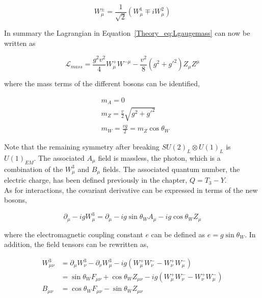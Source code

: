 \begin{equation}
    W_\mu^\pm = \frac{1}{\sqrt{2}}(W_\mu^1\mp i W_\mu^2)
\end{equation}

In summary the Lagrangian in Equation~\ref{Theory_eq:Lgaugemass} can now be written as

\begin{equation}
    \mathcal{L}_{mass} = \frac{g^2v^2}{4}W_\mu^+W^{- \mu} - \frac{v^2}{8}(g^2+g'^2)Z_\mu Z^\mu
\end{equation}

where the mass terms of the different bosons can be identified,

\begin{equation}
\begin{split}
    &m_A = 0\\
    &m_Z = \frac{v}{2}\sqrt{g^2+g'^2}\\
    &m_W = \frac{vg}{2} = m_Z \cos\theta_W
\end{split}
\end{equation}

Note that the remaining symmetry after breaking $SU(2)_L\otimes U(1)_L$ is $U(1)_{EM}$. The associated $A_\mu$ field is massless, the photon, which is a combination of the $W_\mu^3$ and $B_\mu$ fields. The associated quantum number, the electric charge, has been defined previously in the chapter, $Q = T_3-Y$.\\

As for interactions, the covariant derivative can be expressed in terms of the new bosons,

\begin{equation}
    \partial_\mu - igW_\mu^3 = \partial_\mu - ig\sin\theta_W A_\mu - ig\cos\theta_W Z_\mu
\end{equation}

where the electromagnetic coupling constant $e$ can be defined as $e=g\sin\theta_W$. In addition, the field tensors can be rewritten as,

\begin{equation}
\begin{split}
    W_{\mu\nu}^3 &= \partial_\mu W_\nu^3 - \partial_\nu W_\mu^3 - ig(W_\mu^+W_\nu^- - W_\nu^+ W_\mu^-)\\
    &= \sin\theta_W F_{\mu\nu} + \cos\theta_W Z_{\mu\nu} - ig(W_\mu^+W_\nu^- - W_\nu^+ W_\mu^-)\\
    B_{\mu\nu} &= \cos\theta_W F_{\mu\nu} - \sin\theta_W Z_{\mu\nu}
\end{split}
\end{equation}


